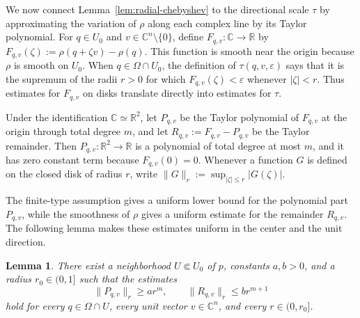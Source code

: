\documentclass[11pt]{article}
\newtheorem{lemma}[theorem]{Lemma}
\theoremstyle{definition}
\newcommand{\C}{\mathbb{C}}
\newcommand{\R}{\mathbb{R}}
\newcommand{\eps}{\varepsilon}
\begin{document}
\bigskip

We now connect Lemma~\ref{lem:radial-chebyshev} to the directional scale
\(\tau\) by approximating the variation of \(\rho\) along each complex line
by its Taylor polynomial.  For \(q\in U_0\) and
\(v\in\C^n\setminus\{0\}\), define \(F_{q,v}:\C\to\R\) by
\(F_{q,v}(\zeta):=\rho(q+\zeta v)-\rho(q)\).
This function is smooth near the origin because \(\rho\) is smooth on
\(U_0\).  When \(q\in\Omega\cap U_0\), the definition of
\(\tau(q,v,\eps)\) says that it is the supremum of the radii \(r>0\)
for which \(F_{q,v}(\zeta)<\eps\) whenever \(|\zeta|<r\).
Thus estimates for \(F_{q,v}\) on disks translate directly into
estimates for \(\tau\).

Under the identification \(\C\simeq\R^2\), let \(P_{q,v}\) be the
Taylor polynomial of \(F_{q,v}\) at the origin through total degree
\(m\), and let \(R_{q,v}:=F_{q,v}-P_{q,v}\) be the Taylor remainder.
Then
\(P_{q,v}:\R^2\to\R\) is a polynomial of total degree at most \(m\), and it
has zero constant term because \(F_{q,v}(0)=0\).  Whenever a function \(G\)
is defined on the closed disk of radius \(r\), write
\(\|G\|_r:=\sup_{|\zeta|\le r}|G(\zeta)|\).

The finite-type assumption gives a uniform lower bound for the polynomial
part \(P_{q,v}\), while the smoothness of \(\rho\) gives a uniform estimate
for the remainder \(R_{q,v}\).  The following lemma makes these estimates
uniform in the center and the unit direction.
\begin{lemma}\label{lem:uniform-line-jets}
	There exist a neighborhood \(U\Subset U_0\) of \(p\), constants
	\(a,b>0\), and a radius \(r_0\in(0,1]\) such that the estimates
	\begin{equation*}
		\|P_{q,v}\|_r\ge ar^m,
		\qquad
		\|R_{q,v}\|_r\le br^{m+1}
	\end{equation*}
	hold for every \(q\in\Omega\cap U\), every unit vector \(v\in\C^n\),
	and every \(r\in(0,r_0]\).
\end{lemma}
\end{document}
